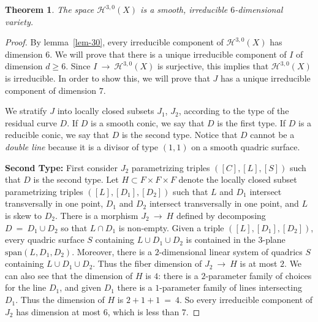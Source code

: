 \documentclass[twoside,12pt,reqno]{amsart}
\theoremstyle{plain}
\newtheorem{thm}{Theorem}[section]
\theoremstyle{definition}
\newcommand{\Hdg}[2]{\mathcal{H}^{#1,#2}}
\def\ps{\vspace{4pt}}
\begin{document}
\ps

\begin{thm}\label{thm-irr30} The space $\Hdg{3}{0}(X)$ is a smooth, 
irreducible $6$-dimensional variety.
\end{thm}

\begin{proof}
By lemma~\ref{lem-30}, every irreducible component of $\Hdg{3}{0}(X)$
has dimension $6$.
We will prove that there is a unique irreducible component of 
$I$ of dimension $d\geq 6$. 
Since $I~\rightarrow~ \Hdg{3}{0}(X)$ is surjective, 
this implies that $\Hdg{3}{0}(X)$ is irreducible.
In order to show this, 
we will prove that $J$ has a unique
irreducible component of dimension $7$.

\ps

We stratify $J$ into locally closed subsets $J_1$, $J_2$, according to
the type of 
the residual curve $D$.  If $D$ is a smooth conic, we say that $D$ is
the first type.  If $D$ is a reducible conic, we say that $D$ is the
second type.  Notice that $D$ cannot be a \emph{double line} because
it is a divisor of type $(1,1)$ on a smooth quadric surface.

\ps

\textbf{Second Type:}
First consider $J_2$ parametrizing triples $([C],[L],[S])$ such that
$D$ is the second type.  Let $H\subset F\times F\times F$ denote the
locally closed subset parametrizing triples $([L],[D_1],[D_2])$ such
that $L$ and $D_1$ intersect transversally in one point, $D_1$ and
$D_2$ intersect transversally in one point, and $L$ is skew to $D_2$.
There is a morphism $J_2~\rightarrow~ H$ defined by decomposing
$D~=~D_1\cup D_2$ so that $L\cap D_1$ is non-empty.  Given a triple
$([L],[D_1],[D_2])$, every quadric surface $S$ containing $L\cup
D_1\cup D_2$ is contained in the $3$-plane $\text{span}(L,D_1,D_2)$.
Moreover, there is a $2$-dimensional linear system of quadrics $S$
containing $L\cup D_1\cup D_2$.  Thus the fiber dimension of
$J_2~\rightarrow~ H$ is at most $2$.  We can also see that the dimension
of $H$ is $4$:  there is a $2$-parameter family of choices for the
line $D_1$, and given $D_1$ there is a $1$-parameter family of lines
intersecting $D_1$.  Thus the dimension of $H$ is $2+1+1~=~4$.  So every 
irreducible component of $J_2$ has dimension at most $6$, which is
less than $7$.

\ps


\end{proof}
\end{document}
